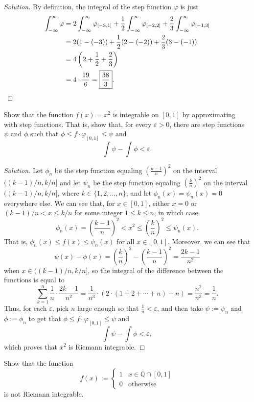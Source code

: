 \documentclass[11pt]{scrartcl}
\providecommand{\eps}{\varepsilon}
\providecommand{\half}{\frac{1}{2}}
\providecommand{\QQ}{\mathbb Q}
\newenvironment{soln}{\begin{proof}[Solution]}{\end{proof}}
\begin{document}
\begin{soln}
	By definition, the integral of the step function $\varphi$ is just
	\begin{align*}
		\int_{-\infty}^\infty \varphi &=
		2\int_{-\infty}^\infty \varphi_{[-3,1]} +
		\frac12\int_{-\infty}^\infty \varphi_{[-2,2]} +
		\frac23\int_{-\infty}^\infty \varphi_{[-1,3]}\\
		&= 2(1 - (-3)) + \half(2 - (-2)) + \frac23(3 - (-1))\\
		&= 4\left(2 + \half + \frac23\right)\\
		&= 4\cdot\frac{19}6 = \boxed{\frac{38}{3}}.\qedhere
	\end{align*}
\end{soln}

\begin{problem}
	Show that the function $f(x) = x^2$ is integrable on $[0,1]$
	by approximating with step functions. That is, show that,
	for every $\eps > 0$, there are step functions $\psi$ and $\phi$
	such that $\phi\le f\cdot\varphi_{[0,1]}\le\psi$ and
	\[\int\psi - \int\phi < \eps.\]
\end{problem}

\begin{soln}
	Let $\phi_n$ be the step function equaling $\left(\frac{k-1}{n}\right)^2$
	on the interval $((k-1)/n, k/n]$
	and let $\psi_n$ be the step function
	equaling $\left(\frac kn\right)^2$ on the interval $((k-1)/n, k/n]$,
	where $k\in\{1, 2, \dots, n\}$,
	and let $\phi_n(x) = \psi_n(x) = 0$ everywhere else.
	We can see that, for $x\in[0,1]$, either $x = 0$
	or $(k-1)/n < x \le k/n$ for some integer $1\le k\le n$, in which case
	\[\phi_n(x) = \left(\frac{k-1}{n}\right)^2 < x^2
	\le \left(\frac kn\right)^2 \le \psi_n(x).\]
	That is, $\phi_n(x) \le f(x) \le \psi_n(x)$ for all $x\in[0,1]$.
	Moreover, we can see that
	\[\psi(x) - \phi(x) = \left(\frac kn\right)^2 - \left(\frac{k-1}{n}\right)^2
	= \frac{2k-1}{n^2}\]
	when $x\in((k-1)/n, k/n]$, so the integral
	of the difference between the functions is equal to
	\[\sum_{k=1}^n \frac{1}{n}\cdot \frac{2k-1}{n^2}
	= \frac{1}{n^3}\cdot(2\cdot(1 + 2 + \cdots + n) - n)
	= \frac{n^2}{n^3} = \frac 1n.\]
	Thus, for each $\eps$, pick $n$ large enough so that $\frac 1n < \eps$,
	and then take $\psi := \psi_n$ and $\phi := \phi_n$
	to get that $\phi \le f\cdot\varphi_{[0,1]} \le \psi$ and
	\[\int \psi - \int \phi < \eps,\]
	which proves that $x^2$ is Riemann integrable.
\end{soln}

\begin{problem}
	Show that the function
	\[f(x) := \begin{cases}
		1 & x\in\QQ\cap[0,1]\\
		0 & \text{otherwise}
	\end{cases}\]
	is not Riemann integrable.
\end{problem}
\end{document}
